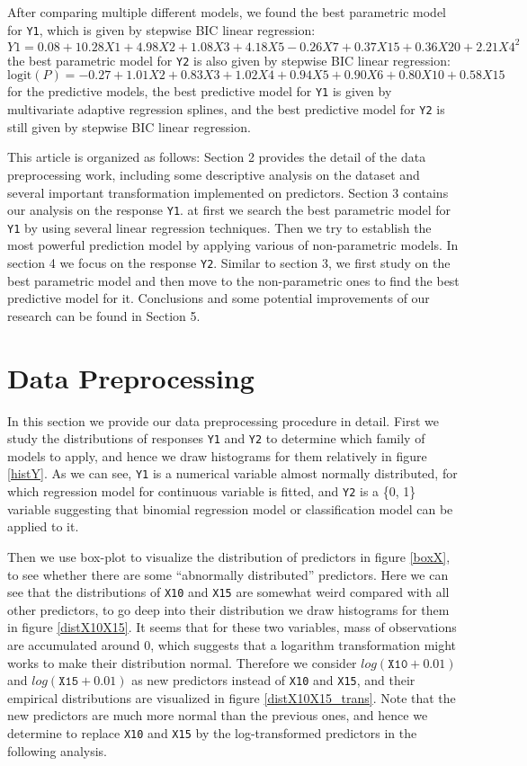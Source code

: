 \documentclass[11pt,oneside,a4paper]{article}
\newcommand{\m}[1]{\texttt{{#1}}}
\begin{document}
After comparing multiple different models, we found the best parametric model for \m{Y1}, which is given by stepwise BIC linear regression:
$$Y1 = 0.08 + 10.28X1 +  4.98X2 + 1.08X3 + 4.18X5 -0.26X7 + 0.37X15 + 0.36X20 + 2.21{X4}^{2}$$
the best parametric model for \m{Y2} is also given by stepwise BIC linear regression:
$$\mathrm{logit}(P) = -0.27 + 1.01X2 + 0.83X3 + 1.02X4 + 0.94X5 + 0.90X6 + 0.80X10 + 0.58X15$$
for the predictive models, the best predictive model for \m{Y1} is given by multivariate adaptive regression splines, and the best predictive model for \m{Y2} is still given by stepwise BIC linear regression.

This article is organized as follows: Section 2 provides the detail of the data preprocessing work, including some descriptive analysis on the dataset and several important transformation implemented on predictors. Section 3 contains our analysis on the response \m{Y1}. at first we search the best parametric model for \m{Y1} by using several linear regression techniques. Then we try to establish the most powerful prediction model by applying various of non-parametric models. In section 4 we focus on the response \m{Y2}. Similar to section 3, we first study on the best parametric model and then move to the non-parametric ones to find the best predictive model for it. Conclusions and some potential improvements of our research can be found in Section 5.

\section{Data Preprocessing}
In this section we provide our data preprocessing procedure in detail. First we study the distributions of responses \m{Y1} and \m{Y2} to determine which family of models to apply, and hence we draw histograms for them relatively in figure \ref{histY}. As we can see, \m{Y1} is a numerical variable almost normally distributed, for which regression model for continuous variable is fitted, and \m{Y2} is a \{0, 1\} variable suggesting that binomial regression model or classification model can be applied to it.

Then we use box-plot to visualize the distribution of predictors in figure \ref{boxX}, to see whether there are some ``abnormally distributed'' predictors. Here we can see that the distributions of \m{X10} and \m{X15} are somewhat weird compared with all other predictors, to go deep into their distribution we draw histograms for them in figure \ref{distX10X15}. It seems that for these two variables, mass of observations are accumulated around 0, which suggests that a logarithm transformation might works to make their distribution normal. Therefore we consider $log(\m{X10} + 0.01)$ and $log(\m{X15} + 0.01)$ as new predictors instead of \m{X10} and \m{X15}, and their empirical distributions are visualized in figure \ref{distX10X15_trans}. Note that the new predictors are much more normal than the previous ones, and hence we determine to replace \m{X10} and \m{X15} by the log-transformed predictors in the following analysis.
\end{document}
